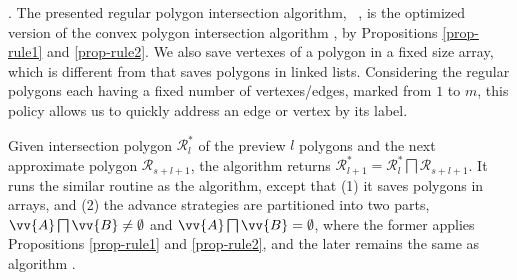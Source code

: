 .
The presented regular polygon intersection algorithm, \ie\ \rpia, is the optimized version  of the convex polygon intersection algorithm \cpia, by Propositions \ref{prop-rule1} and \ref{prop-rule2}. We also save vertexes of a polygon in a fixed size array, which is different from \cpia  that saves polygons in linked lists.
Considering the regular polygons each having a fixed number of vertexes/edges, marked from $1$ to $m$, this policy allows us to quickly address an edge or vertex by its label.

Given intersection polygon $\mathcal{R}^*_{l}$ of the preview $l$ polygons and the next approximate polygon $\mathcal{R}_{s+l+1}$, the algorithm \rpia returns $\mathcal{R}^*_{l+1}=\mathcal{R}^*_{l}  \bigsqcap \mathcal{R}_{s+l+1}$.
It runs the similar routine as the \cpia algorithm, except that (1) it saves polygons in arrays, and (2) the advance strategies are partitioned into two parts, \ie $\vv{A} \bigsqcap \vv{B} \ne \emptyset$ and $\vv{A} \bigsqcap \vv{B} = \emptyset$, where the former applies Propositions \ref{prop-rule1} and \ref{prop-rule2}, and the later remains the same as algorithm \cpia.





